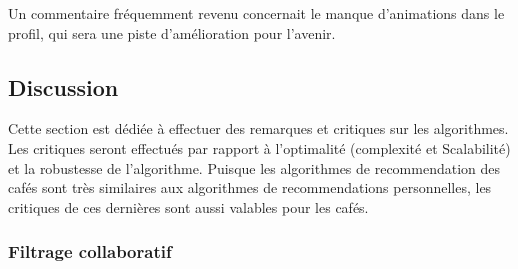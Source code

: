 \documentclass[11pt]{article}
\begin{document}
Un commentaire fréquemment revenu concernait le manque d'animations dans le profil, qui sera une piste d'amélioration pour l'avenir.

\subsection{Discussion}
Cette section est dédiée à effectuer des remarques et critiques sur les algorithmes. Les critiques seront effectués par rapport à l'optimalité (complexité et Scalabilité) et la robustesse de l'algorithme. Puisque les algorithmes de recommendation des cafés sont très similaires aux algorithmes de recommendations personnelles, les critiques de ces dernières sont aussi valables pour les cafés.

\subsubsection{Filtrage collaboratif}
\end{document}
